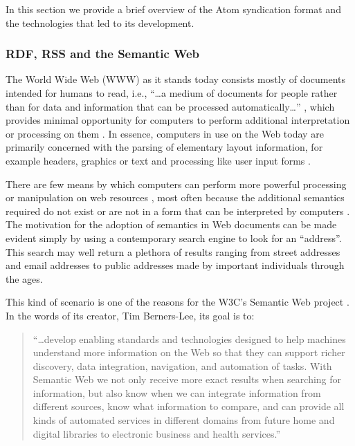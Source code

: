 \documentclass{CRPITStyle}
\begin{document}
In this section we provide a brief overview of the Atom syndication
format and the technologies that led to its development.


\subsubsection{RDF, RSS and the Semantic Web}
\label{sec-rdf-rss}

The World Wide Web (WWW) as it stands today consists mostly of documents
intended for humans to read, i.e., ``\ldots{}a medium of documents for
people rather than for data and information that can be processed
automatically\ldots'' \cite{Bern-T-2001-SciAm}, which provides minimal
opportunity for computers to perform additional interpretation or
processing on them \cite{Bern-T-1999-WWW,Bern-T-2001-SciAm}. In essence,
computers in use on the Web today are primarily concerned with the
parsing of elementary layout information, for example headers, graphics
or text and processing like user input forms
\cite{Bern-T-1999-W3C,Bern-T-2001-SciAm}.

There are few means by which computers can perform more powerful
processing or manipulation on web resources
\cite{Bern-T-2001-SciAm,Fens-D-2003}, most often because the additional
semantics required do not exist or are not in a form that can be
interpreted by computers \cite{Koiv-MR-2001-W3C}. The motivation for the
adoption of semantics in Web documents can be made evident simply by
using a contemporary search engine to look for an ``address''. This
search may well return a plethora of results ranging from street
addresses and email addresses to public addresses made by important
individuals through the ages.

This kind of scenario is one of the reasons for the W3C's Semantic Web
project \cite{Koiv-MR-2001-W3C}. In the words of its creator, Tim
Berners-Lee, its goal is to:

\begin{quotation}
	``\ldots{}develop enabling standards and technologies designed to help
	machines understand more information on the Web so that they can
	support richer discovery, data integration, navigation, and
	automation of tasks. With Semantic Web we not only receive more
	exact results when searching for information, but also know when we
	can integrate information from different sources, know what
	information to compare, and can provide all kinds of automated
	services in different domains from future home and digital libraries
	to electronic business and health services.'' \cite{Koiv-MR-2001-W3C}
\end{quotation}
\end{document}
